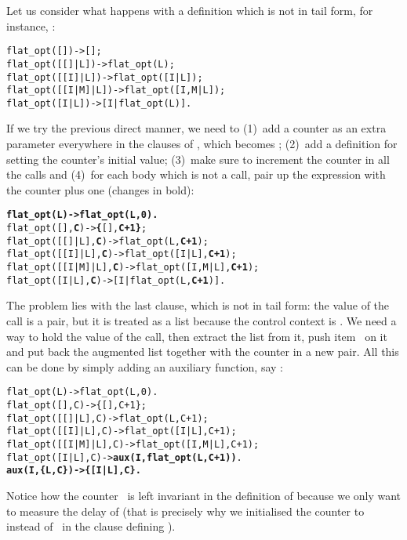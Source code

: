 Let us consider what happens with a definition which is not in tail
form, for instance,  :
\begin{alltt}
flat_opt(       []) -> [];
flat_opt(   [[]|L]) -> flat_opt(L);
flat_opt(  [[I]|L]) -> flat_opt([I|L]);
flat_opt([[I|M]|L]) -> flat_opt([I,M|L]);
flat_opt(    [I|L]) -> [I|flat_opt(L)].
\end{alltt}
If we try the previous direct manner, we need to (1)~add a counter as
an extra parameter everywhere in the clauses of ,
which becomes ; (2)~add a definition for
 setting the counter's initial value; (3)~make
sure to increment the counter in all the calls and (4)~for each body
which is not a call, pair up the expression with the counter plus one
(changes in bold):
\begin{alltt}
\textbf{flat_opt(L)           -> flat_opt(L,0).}\hfill% \emph{Not} 1
flat_opt(       [],\textbf{C}) -> \textbf{\{}[],\textbf{C+1\}};
flat_opt(   [[]|L],\textbf{C}) -> flat_opt(L,\textbf{C+1});
flat_opt(  [[I]|L],\textbf{C}) -> flat_opt([I|L],\textbf{C+1});
flat_opt([[I|M]|L],\textbf{C}) -> flat_opt([I,M|L],\textbf{C+1});
flat_opt(    [I|L],\textbf{C}) -> [I|flat_opt(L,\textbf{C+1})].\hfill% \emph{Problem}
\end{alltt}
The problem lies with the last clause, which is not in tail form: the
value of the call  is a pair, but it is
treated as a list because the control context is
\erlcode{[I|\textvisiblespace]}. We need a way to hold the value of
the call, then extract the list from it, push item~ on it
and put back the augmented list together with the counter in a new
pair. All this can be done by simply adding an auxiliary function, say
:
\begin{alltt}
flat_opt(L)           -> flat_opt(L,0).
flat_opt(       [],C) -> \{[],C+1\};
flat_opt(   [[]|L],C) -> flat_opt(L,C+1);
flat_opt(  [[I]|L],C) -> flat_opt([I|L],C+1);
flat_opt([[I|M]|L],C) -> flat_opt([I,M|L],C+1);
flat_opt(    [I|L],C) -> \textbf{aux(I,flat_opt(L,C+1))}.
\textbf{aux(I,\{L,C\})          -> \{[I|L],C\}.}\hfill% C \emph{unchanged}
\end{alltt}
Notice how the counter~ is left invariant in the definition
of  because we only want to measure the delay of
 (that is precisely why we initialised the
counter to~ instead of~ in the clause defining
).

